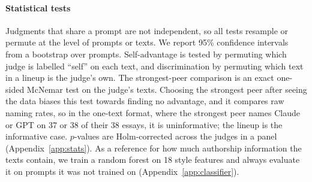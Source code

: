 \paragraph{Statistical tests}
Judgments that share a prompt are not independent, so all tests resample or
permute at the level of prompts or texts. We report 95\% confidence intervals
from a bootstrap over prompts. Self-advantage is tested by permuting which judge
is labelled ``self'' on each text, and discrimination by permuting which text
in a lineup is the judge's own. The strongest-peer comparison is an exact
one-sided McNemar test on the judge's texts. Choosing the strongest peer after
seeing the data biases this test towards finding no advantage, and it compares
raw naming rates, so in the one-text format, where the strongest peer names
Claude or GPT on 37 or 38 of their 38 essays, it is uninformative; the lineup is the
informative case. $p$-values are Holm-corrected across the judges
in a panel (Appendix~\ref{app:stats}). As a reference for how much authorship
information the texts contain, we train a random forest on 18 style features and
always evaluate it on prompts it was not trained on
(Appendix~\ref{app:classifier}).
